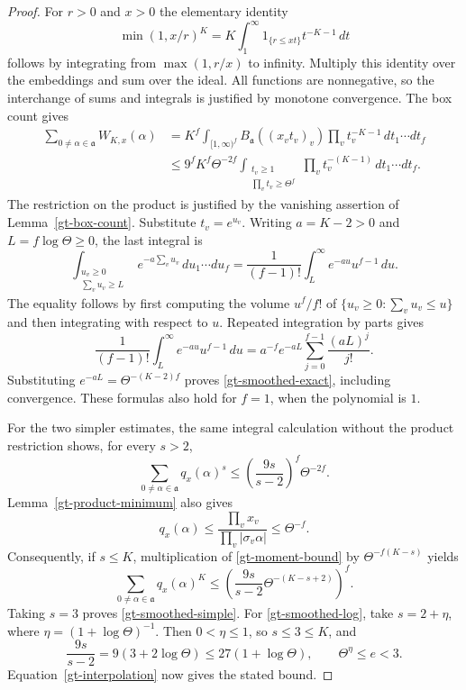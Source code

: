 \begin{proof}
For $r>0$ and $x>0$ the elementary identity
\[
 \min(1,x/r)^K
       =K\int_1^\infty 1_{\{r\leq xt\}}t^{-K-1}\,dt
\]
follows by integrating from $\max(1,r/x)$ to infinity.
Multiply this identity over the embeddings and sum over the ideal.
All functions are nonnegative, so the interchange of sums and
integrals is justified by monotone convergence.  The box count gives
\begin{align*}
 \sum_{0\ne\alpha\in\mathfrak a}W_{K,x}(\alpha)
 &=K^f\int_{[1,\infty)^f}
        B_{\mathfrak a}((x_vt_v)_v)
                 \prod_vt_v^{-K-1}\,dt_1\cdots dt_f\\
 &\leq9^fK^f\Theta^{-2f}
       \int_{\substack{t_v\geq1\\\prod_vt_v\geq\Theta^f}}
                         \prod_vt_v^{-(K-1)}\,dt_1\cdots dt_f.
\end{align*}
The restriction on the product is justified by the vanishing
assertion of Lemma~\ref{gt-box-count}.  Substitute $t_v=e^{u_v}$.
Writing $a=K-2>0$ and $L=f\log\Theta\geq0$, the last integral is
\[
 \int_{\substack{u_v\geq0\\\sum_vu_v\geq L}}
                      e^{-a\sum_vu_v}\,du_1\cdots du_f
   =\frac1{(f-1)!}\int_L^\infty e^{-au}u^{f-1}\,du.
\]
The equality follows by first computing the volume
$u^f/f!$ of $\{u_v\geq0:\sum_vu_v\leq u\}$ and then integrating
with respect to $u$.  Repeated integration by parts gives
\[
 \frac1{(f-1)!}\int_L^\infty e^{-au}u^{f-1}\,du
       =a^{-f}e^{-aL}\sum_{j=0}^{f-1}\frac{(aL)^j}{j!}.
\]
Substituting $e^{-aL}=\Theta^{-(K-2)f}$ proves
\eqref{gt-smoothed-exact}, including convergence.  These formulas
also hold for $f=1$, when the polynomial is $1$.

For the two simpler estimates, the same integral calculation without
the product restriction shows, for every $s>2$,
\begin{equation}\label{gt-moment-bound}
 \sum_{0\ne\alpha\in\mathfrak a}q_x(\alpha)^s
       \leq\left(\frac{9s}{s-2}\right)^f\Theta^{-2f}.
\end{equation}
Lemma~\ref{gt-product-minimum} also gives
\begin{equation}\label{gt-q-bound}
 q_x(\alpha)\leq
       \frac{\prod_vx_v}{\prod_v|\sigma_v\alpha|}
       \leq\Theta^{-f}.
\end{equation}
Consequently, if $s\leq K$, multiplication of
\eqref{gt-moment-bound} by $\Theta^{-f(K-s)}$ yields
\begin{equation}\label{gt-interpolation}
 \sum_{0\ne\alpha\in\mathfrak a}q_x(\alpha)^K
       \leq\left(\frac{9s}{s-2}
                         \Theta^{-(K-s+2)}\right)^f.
\end{equation}
Taking $s=3$ proves \eqref{gt-smoothed-simple}.
For \eqref{gt-smoothed-log}, take
$s=2+\eta$, where $\eta=(1+\log\Theta)^{-1}$.
Then $0<\eta\leq1$, so $s\leq3\leq K$, and
\[
 \frac{9s}{s-2}=9(3+2\log\Theta)
       \leq27(1+\log\Theta),\qquad
 \Theta^\eta\leq e<3.
\]
Equation~\eqref{gt-interpolation} now gives the stated bound.
\end{proof}

